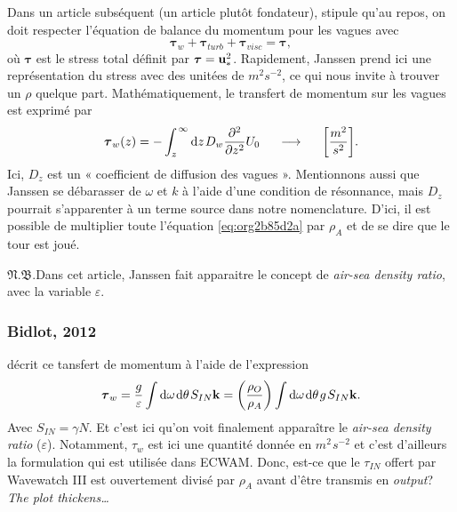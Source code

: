 \documentclass[10pt]{report}
\numberwithin{equation}{section}
\newcommand{\uu}{\vb{u}}
\newcommand{\pt}{\hspace{1pt}} %
\newcommand{\nb}{\underline{{\footnotesize\EightStarConvex}\pt $\mathfrak{N.B.}$\vphantom{p}}\hspace{3pt}}
\begin{document}
Dans un article subséquent (un article plutôt fondateur), \textcite[voir eq. 7 et 8 de l'article]{janssen_1991}  stipule qu'au repos, on doit respecter l'équation de balance du momentum pour les vagues avec
\begin{equation}
\label{eq:org2b85d2a}
   \boldsymbol{\tau}_w + \boldsymbol{\tau}_{turb} + \boldsymbol{\tau}_{visc}  = \boldsymbol{\tau},
\end{equation}
où \(\boldsymbol{\tau}\) est le stress total définit par \(\boldsymbol{\tau} = \uu_*^2\).
Rapidement, Janssen prend ici une représentation du stress avec des unitées de \(m^{2} s^{-2}\), ce qui nous invite à trouver un \(\rho\) quelque part.
Mathématiquement, le transfert de momentum sur les vagues est exprimé par
\begin{equation}
   \boldsymbol{\tau}_w(z) = - \int_z^{\pt\infty} \mathrm{d}z\pt D_w \pdv[2]{}{z} U_0 \hspace{0.5cm} \longrightarrow \hspace{0.5cm} \qty[\frac{m^2}{s^2}].
\end{equation}
Ici, \(D_z\) est un « coefficient de diffusion des vagues ».
Mentionnons aussi que Janssen se débarasser de \(\omega\) et \(k\) à l'aide d'une condition de résonnance, mais \(D_z\) pourrait s'apparenter à un terme source dans notre nomenclature.
D'ici, il est possible de multiplier toute l'équation \ref{eq:org2b85d2a} par \(\rho_A\) et de se dire que le tour est joué.\bigskip

\nb Dans cet article, Janssen fait apparaitre le concept de \emph{air-sea density ratio}, avec la variable \(\varepsilon\).


\subsubsection{Bidlot, 2012}
\label{sec:org3e8c87e}

\Textcite[voir eq. 6 de l'article]{bidlot2012present} décrit ce tansfert de momentum à l'aide de l'expression
\begin{equation}
   \boldsymbol{\tau}_w = \frac{g}{\varepsilon} \int \mathrm{d}\omega\pt \mathrm{d}\theta\pt S_{IN} \vb{k} = \qty(\frac{\rho_O}{\rho_A}) \int \mathrm{d}\omega\pt \mathrm{d}\theta\pt g\pt S_{IN} \vb{k}.
\end{equation}
Avec \(S_{IN} = \gamma N\).
Et c'est ici qu'on voit finalement apparaître le \emph{air-sea density ratio} (\(\varepsilon\)).
Notamment, \(\tau_w\) est ici une quantité donnée en \(m^2\pt s^{-2}\) et c'est d'ailleurs la formulation qui est utilisée dans ECWAM.
Donc, est-ce que le \(\tau_{IN}\) offert par Wavewatch III est ouvertement divisé par \(\rho_A\) avant d'être transmis en \emph{output}?
\emph{The plot thickens\ldots{}}
\end{document}
